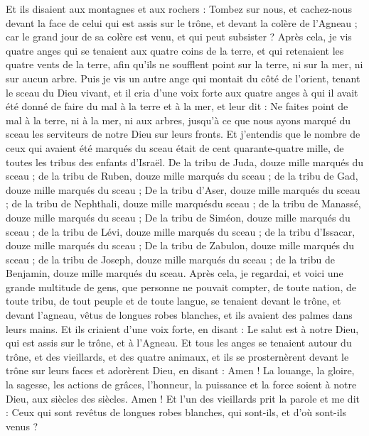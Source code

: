 \begin{multicols}{2}
Et ils disaient aux montagnes et aux rochers : Tombez sur nous, et cachez-nous devant la face de celui qui est assis sur le trône, et devant la colère de l'Agneau ;
car le grand jour de sa colère est venu, et qui peut subsister ?
\VerseOne{}Après cela, je vis quatre anges qui se tenaient aux quatre coins de la terre, et qui retenaient les quatre vents de la terre, afin qu'ils ne soufflent point sur la terre, ni sur la mer, ni sur aucun arbre.
Puis je vis un autre ange qui montait du côté de l'orient, tenant le sceau du Dieu vivant, et il cria d'une voix forte aux quatre anges à qui il avait été donné de faire du mal à la terre et à la mer,
et leur dit : Ne faites point de mal à la terre, ni à la mer, ni aux arbres, jusqu'à ce que nous ayons marqué du sceau les serviteurs de notre Dieu sur leurs fronts.
Et j'entendis que le nombre de ceux qui avaient été marqués du sceau était de cent quarante-quatre mille, de toutes les tribus des enfants d'Israël.
De la tribu de Juda, douze mille marqués du sceau ; de la tribu de Ruben, douze mille marqués du sceau ; de la tribu de Gad, douze mille marqués du sceau ;
De la tribu d'Aser, douze mille marqués du sceau ; de la tribu de Nephthali, douze mille marquésdu sceau ; de la tribu de Manassé, douze mille marqués du sceau ;
De la tribu de Siméon, douze mille marqués du sceau ; de la tribu de Lévi, douze mille marqués du sceau ; de la tribu d'Issacar, douze mille marqués du sceau ;
De la tribu de Zabulon, douze mille marqués du sceau ; de la tribu de Joseph, douze mille marqués du sceau ; de la tribu de Benjamin, douze mille marqués du sceau.
Après cela, je regardai, et voici une grande multitude de gens, que personne ne pouvait compter, de toute nation, de toute tribu, de tout peuple et de toute langue, se tenaient devant le trône, et devant l'agneau, vêtus de longues robes blanches, et ils avaient des palmes dans leurs mains.
Et ils criaient d'une voix forte, en disant : Le salut est à notre Dieu, qui est assis sur le trône, et à l'Agneau.
Et tous les anges se tenaient autour du trône, et des vieillards, et des quatre animaux, et ils se prosternèrent devant le trône sur leurs faces et adorèrent Dieu,
en disant : Amen ! La louange, la gloire, la sagesse, les actions de grâces, l'honneur, la puissance et la force soient à notre Dieu, aux siècles des siècles. Amen !
Et l'un des vieillards prit la parole et me dit : Ceux qui sont revêtus de longues robes blanches, qui sont-ils, et d'où sont-ils venus ?

\end{multicols}

